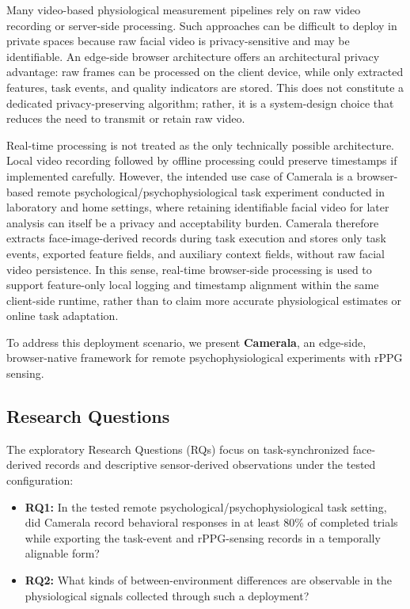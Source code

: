 \documentclass[dvipdfmx]{ehis}
\begin{document}
Many video-based physiological measurement pipelines rely on raw video recording or server-side processing.
Such approaches can be difficult to deploy in private spaces because raw facial video is privacy-sensitive and may be identifiable.
An edge-side browser architecture offers an architectural privacy advantage: raw frames can be processed on the client device, while only extracted features, task events, and quality indicators are stored.
This does not constitute a dedicated privacy-preserving algorithm; rather, it is a system-design choice that reduces the need to transmit or retain raw video.

Real-time processing is not treated as the only technically possible architecture.
Local video recording followed by offline processing could preserve timestamps if implemented carefully.
However, the intended use case of Camerala is a browser-based remote psychological/psychophysiological task experiment conducted in laboratory and home settings, where retaining identifiable facial video for later analysis can itself be a privacy and acceptability burden.
Camerala therefore extracts face-image-derived records during task execution and stores only task events, exported feature fields, and auxiliary context fields, without raw facial video persistence.
In this sense, real-time browser-side processing is used to support feature-only local logging and timestamp alignment within the same client-side runtime, rather than to claim more accurate physiological estimates or online task adaptation.

To address this deployment scenario, we present \textbf{Camerala}, an edge-side, browser-native framework for remote psychophysiological experiments with rPPG sensing.

\subsection{Research Questions}
The exploratory Research Questions (RQs) focus on task-synchronized face-derived records and descriptive sensor-derived observations under the tested configuration:
\begin{itemize}
    \item \textbf{RQ1:} In the tested remote psychological/psychophysiological task setting, did Camerala record behavioral responses in at least 80\% of completed trials while exporting the task-event and rPPG-sensing records in a temporally alignable form?
    \item \textbf{RQ2:} What kinds of between-environment differences are observable in the physiological signals collected through such a deployment?
\end{itemize}
\end{document}
